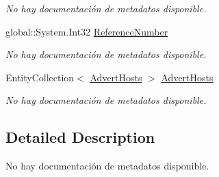 \begin{DoxyCompactItemize}
\begin{DoxyCompactList}\small\item\em No hay documentación de metadatos disponible. \end{DoxyCompactList}\item 
global\-::\-System.\-Int32 \hyperlink{class_microsoft_1_1_samples_1_1_kinect_1_1_basic_interactions_1_1_locations_a774db2e6845741c8dfa16fd2ad794f68}{Reference\-Number}
\begin{DoxyCompactList}\small\item\em No hay documentación de metadatos disponible. \end{DoxyCompactList}\item 
Entity\-Collection$<$ \hyperlink{class_microsoft_1_1_samples_1_1_kinect_1_1_basic_interactions_1_1_advert_hosts}{Advert\-Hosts} $>$ \hyperlink{class_microsoft_1_1_samples_1_1_kinect_1_1_basic_interactions_1_1_locations_a3e8798c72280a1fbaefa115062ce8467}{Advert\-Hosts}
\begin{DoxyCompactList}\small\item\em No hay documentación de metadatos disponible. \end{DoxyCompactList}\end{DoxyCompactItemize}


\subsection{Detailed Description}
No hay documentación de metadatos disponible. 



